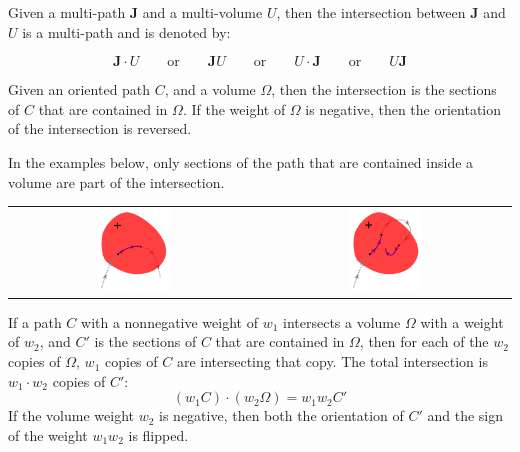 Given a multi-path \(\mathbf{J}\) and a multi-volume \(U\), then the intersection between \(\mathbf{J}\) and \(U\) is a multi-path and is denoted by:

\[\mathbf{J} \cdot U \quad\quad\text{or}\quad\quad \mathbf{J} U \quad\quad\text{or}\quad\quad U \cdot \mathbf{J} \quad\quad\text{or}\quad\quad U \mathbf{J}\]

Given an oriented path \(C\), and a volume \(\Omega\), then the intersection is the sections of \(C\) that are contained in \(\Omega\). If the weight of \(\Omega\) is negative, then the orientation of the intersection is reversed. %

In the examples below, only sections of the path that are contained inside a volume are part of the intersection.

\begin{center}
\begin{tabular}{cc}
\includegraphics[width = 0.3\textwidth]{Intersections/Path-volume_intersections/path_volume_intersections_example}
& 
\includegraphics[width = 0.3\textwidth]{Intersections/Path-volume_intersections/path_volume_intersections_example_2}
\end{tabular}
\end{center}

If a path \(C\) with a nonnegative weight of \(w_1\) intersects a volume \(\Omega\) with a weight of \(w_2\), and \(C'\) is the sections of \(C\) that are contained in \(\Omega\), then for each of the \(w_2\) copies of \(\Omega\), \(w_1\) copies of \(C\) are intersecting that copy. The total intersection is \(w_1 \cdot w_2\) copies of \(C'\):
\[(w_1 C) \cdot (w_2 \Omega) = w_1 w_2 C'\] 
If the volume weight \(w_2\) is negative, then both the orientation of \(C'\) and the sign of the weight \(w_1 w_2\) is flipped. 

